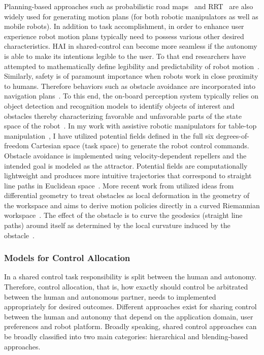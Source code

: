 \documentclass[12pt]{article}
\begin{document}
Planning-based approaches such as probabilistic road maps~\cite{kavraki1996analysis} and RRT~\cite{kuffner2000rrt} are also widely used for generating motion plans (for both robotic manipulators as well as mobile robots). In addition to task accomplishment, in order to enhance user experience robot motion plans typically need to possess various other desired characteristics. HAI in shared-control can become more seamless if the autonomy is able to make its intentions legible to the user. To that end researchers have attempted to mathematically define legibility and predictability of robot motion~\cite{dragan2013legibility}. Similarly, safety is of paramount importance when robots work in close proximity to humans. Therefore behaviors such as obstacle avoidance are incorporated into navigation plans~\cite{storms2014blending}. To this end, the on-board perception system typically relies on object detection and recognition models to identify objects of interest and obstacles thereby characterizing favorable and unfavorable parts of the state space of the robot~\cite{muller2006off}. In my work with assistive robotic manipulators for table-top manipulation~\cite{gopinath2017human}, I have utilized potential fields defined in the full six degrees-of-freedom Cartesian space (task space) to generate the robot control commands. Obstacle avoidance is implemented using velocity-dependent repellers and the intended goal is modeled as the attractor. Potential fields are computationally lightweight and produces more intuitive trajectories that correspond to straight line paths in Euclidean space~\cite{khatib1986real}. More recent work from utilized ideas from differential geometry to treat obstacles as local deformation in the geometry of the workspace and aims to derive motion policies directly in a curved Riemannian workspace~\cite{ratliff2018riemannian}. The effect of the obstacle is to curve the geodesics (straight line paths) around itself as determined by the local curvature induced by the obstacle~\cite{mainprice2016warping}. 
\subsubsection{Models for Control Allocation}

In a shared control task responsibility is split between the human and autonomy. Therefore, control allocation, that is, how exactly should control be arbitrated between the human and autonomous partner, needs to implemented appropriately for desired outcomes. Different approaches exist for sharing control between the human and autonomy that depend on the application domain, user preferences and robot platform. 
Broadly speaking, shared control approaches can be broadly classified into two main categories: hierarchical and blending-based approaches.
\end{document}
